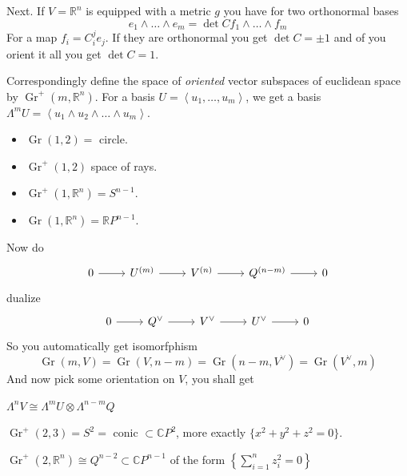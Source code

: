 Next. If \(V=\mathbb{R}^n\) is equipped with a metric \(g\) you have for two orthonormal bases
\[e_1 \wedge \ldots \wedge e_m=\det C f_1\wedge \ldots \wedge f_m\]
For a map \(f_i=C_i^j e_j\). If they are orthonormal you get \(\det C=\pm 1\) and of you orient it all you get \(\det C=1\).

Correspondingly define the space of \textit{oriented} vector subspaces of euclidean space by \(\operatorname{Gr}^+(m,\mathbb{R}^n)\).
For a basis \(U=\left<u_1,\ldots,u_m\right>\), we get a basis \(\Lambda^{m}U=\left<u_1\wedge u_2\wedge\ldots \wedge u_m\right>\).


\begin{example}\leavevmode
\begin{itemize}
\item \(\operatorname{Gr}(1,2)=\) circle.
\item \(\operatorname{Gr}^+(1,2)\) space of rays.
\item \(\operatorname{Gr}^+(1,\mathbb{R}^n)=S^{n-1}\).
\item \(\operatorname{Gr}(1,\mathbb{R}^n)=\mathbb{R}P^{n-1}\).
\end{itemize}
\end{example}

Now do
\[\begin{tikzcd}0\arrow[r]&U^{(m)}\arrow[r]&V^{(n)}\arrow[r]&Q^{(n-m)}\arrow[r]&0\end{tikzcd}\]
dualize
\[\begin{tikzcd}0\arrow[r]&Q^\vee\arrow[r]&V^\vee\arrow[r]&U^\vee\arrow[r]&0\end{tikzcd}\]
So you automatically get isomorfphism
\[\operatorname{Gr}(m,V)=\operatorname{Gr}(V,n-m)=\operatorname{Gr}(n-m,V^\vee)=\operatorname{Gr}(V^\vee,m)\]
And now pick some orientation on \(V\), you shall get 
\begin{exercise}\leavevmode
\(\Lambda^{n}V \cong \Lambda^{m}U \otimes \Lambda^{n-m}Q\)
\end{exercise}

\begin{example}\leavevmode
\(\operatorname{Gr}^+(2,3)=S^2=\) conic \(\subset\mathbb{C}P^{2}\), more exactly \(\{x^2+y^2+z^2=0\}\).
\end{example}

\begin{exercise}\leavevmode
\(\operatorname{Gr}^+(2,\mathbb{R}^n)\cong Q^{n-2}\subset \mathbb{C}P^{n-1}\) of the form \(\left\{\sum_{i=1}^n z_i^2=0\right\}\)
\end{exercise}

